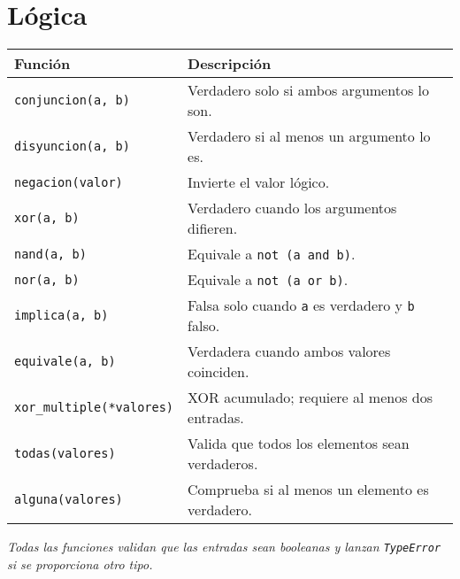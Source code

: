 \documentclass{article}
\begin{document}
\section*{Lógica}
\begin{tabular}{ll}
\textbf{Función} & \textbf{Descripción}\\\hline
\texttt{conjuncion(a, b)} & Verdadero solo si ambos argumentos lo son.\\
\texttt{disyuncion(a, b)} & Verdadero si al menos un argumento lo es.\\
\texttt{negacion(valor)} & Invierte el valor lógico.\\
\texttt{xor(a, b)} & Verdadero cuando los argumentos difieren.\\
\texttt{nand(a, b)} & Equivale a \texttt{not (a and b)}.\\
\texttt{nor(a, b)} & Equivale a \texttt{not (a or b)}.\\
\texttt{implica(a, b)} & Falsa solo cuando \texttt{a} es verdadero y \texttt{b} falso.\\
\texttt{equivale(a, b)} & Verdadera cuando ambos valores coinciden.\\
\texttt{xor\_multiple(*valores)} & XOR acumulado; requiere al menos dos entradas.\\
\texttt{todas(valores)} & Valida que todos los elementos sean verdaderos.\\
\texttt{alguna(valores)} & Comprueba si al menos un elemento es verdadero.\\
\end{tabular}

\textit{Todas las funciones validan que las entradas sean booleanas y lanzan \texttt{TypeError} si se proporciona otro tipo.}
\end{document}
